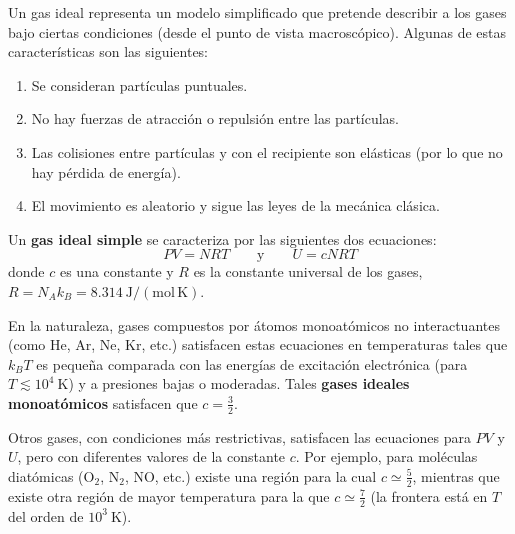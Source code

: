 Un gas ideal representa un modelo simplificado que pretende describir a los gases bajo ciertas
condiciones (desde el punto de vista macroscópico). Algunas de estas características son las
siguientes:
\begin{enumerate}[label=\arabic*.,itemsep=0pt]
  \item Se consideran partículas puntuales.
  \item No hay fuerzas de atracción o repulsión entre las partículas.
  \item Las colisiones entre partículas y con el recipiente son elásticas (por lo que no hay
    pérdida de energía).
  \item El movimiento es aleatorio y sigue las leyes de la mecánica clásica.
\end{enumerate}
Un \textbf{gas ideal simple} se caracteriza por las siguientes dos ecuaciones:
\begin{equation*}
  \boxed{PV=NRT\qquad\text{y}\qquad U=cNRT}
\end{equation*}
donde $c$ es una constante y $R$ es la constante universal de los gases,
$R=N_Ak_B=8.314\ \mathrm{J/(mol\,K)}$.

En la naturaleza, gases compuestos por átomos monoatómicos no interactuantes (como He, Ar, Ne, Kr,
etc.) satisfacen estas ecuaciones en temperaturas tales que $k_BT$ es pequeña comparada con las
energías de excitación electrónica (para $T\lesssim10^{4}\ \mathrm{K}$) y a presiones bajas o
moderadas. Tales \textbf{gases ideales monoatómicos} satisfacen que $c=\tfrac{3}{2}$.

Otros gases, con condiciones más restrictivas, satisfacen las ecuaciones para $PV$ y $U$, pero con
diferentes valores de la constante $c$. Por ejemplo, para moléculas diatómicas ($\mathrm{O_2}$,
$\mathrm{N_2}$, NO, etc.) existe una región para la cual $c\simeq\tfrac{5}{2}$, mientras que existe
otra región de mayor temperatura para la que $c\simeq\tfrac{7}{2}$ (la frontera está en $T$ del
orden de $10^{3}\ \mathrm{K}$).

